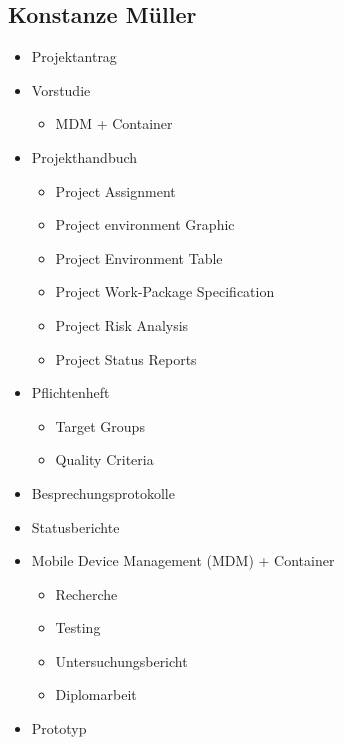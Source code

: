 \begin{minipage}[t]{0.47\textwidth}
	\subsection{Konstanze Müller}
	\begin{itemize}
		\item Projektantrag
		\item Vorstudie
		\begin{itemize}
			\item MDM + Container
		\end{itemize}
		\item Projekthandbuch
		\begin{itemize}
			\item Project Assignment
			\item Project environment Graphic
			\item Project Environment Table
			\item Project Work-Package Specification
			\item Project Risk Analysis
			\item Project Status Reports
		\end{itemize}
		\item Pflichtenheft
		\begin{itemize}
			\item Target Groups
			\item Quality Criteria
		\end{itemize}
		\item Besprechungsprotokolle
		\item Statusberichte
		\item Mobile Device Management (MDM) + Container
		\begin{itemize}
			\item Recherche
			\item Testing
			\item Untersuchungsbericht
			\item Diplomarbeit
		\end{itemize}
		\item Prototyp
	\end{itemize}
\end{minipage}

\newpage

